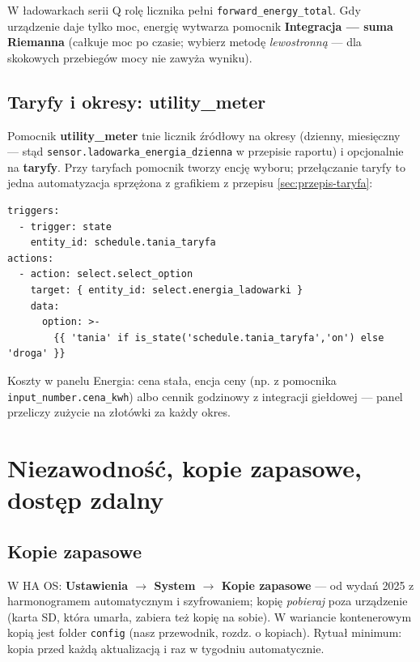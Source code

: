 \documentclass[11pt,a4paper]{article}
\begin{document}
W ładowarkach serii Q rolę licznika pełni \texttt{forward\_energy\_total}. Gdy urządzenie daje tylko moc, energię wytwarza pomocnik \textbf{Integracja --- suma Riemanna} (całkuje moc po czasie; wybierz metodę \emph{lewostronną} --- dla skokowych przebiegów mocy nie zawyża wyniku).

\subsection{Taryfy i okresy: utility\_meter}

Pomocnik \textbf{utility\_meter} tnie licznik źródłowy na okresy (dzienny, miesięczny --- stąd \texttt{sensor.ladowarka\_energia\_dzienna} w przepisie raportu) i opcjonalnie na \textbf{taryfy}. Przy taryfach pomocnik tworzy encję wyboru; przełączanie taryfy to jedna automatyzacja sprzężona z grafikiem z przepisu \ref{sec:przepis-taryfa}:

\begin{lstlisting}
triggers:
  - trigger: state
    entity_id: schedule.tania_taryfa
actions:
  - action: select.select_option
    target: { entity_id: select.energia_ladowarki }
    data:
      option: >-
        {{ 'tania' if is_state('schedule.tania_taryfa','on') else 'droga' }}
\end{lstlisting}

Koszty w panelu Energia: cena stała, encja ceny (np. z pomocnika \texttt{input\_number.cena\_kwh}) albo cennik godzinowy z integracji giełdowej --- panel przeliczy zużycie na złotówki za każdy okres.

\section{Niezawodność, kopie zapasowe, dostęp zdalny}
\label{sec:niezawodnosc}

\subsection{Kopie zapasowe}

W HA OS: \textbf{Ustawienia $\to$ System $\to$ Kopie zapasowe} --- od wydań 2025 z harmonogramem automatycznym i szyfrowaniem; kopię \emph{pobieraj} poza urządzenie (karta SD, która umarła, zabiera też kopię na sobie). W wariancie kontenerowym kopią jest folder \texttt{config} (nasz przewodnik, rozdz. o kopiach). Rytuał minimum: kopia przed każdą aktualizacją i raz w tygodniu automatycznie.
\end{document}
